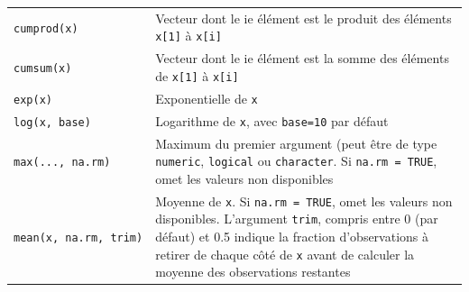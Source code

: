\documentclass[
  11pt,
]{book}
\numberwithin{equation}{section}
\numberwithin{countremarque}{section}
\begin{document}
\begin{longtable}[]{@{}ll@{}}
\begin{minipage}[t]{0.41\columnwidth}
\texttt{cumprod(x)}\strut
\end{minipage} & \begin{minipage}[t]{0.53\columnwidth}\raggedright
Vecteur dont le ie élément est le produit des éléments \texttt{x{[}1{]}} à \texttt{x{[}i{]}}\strut
\end{minipage}\tabularnewline
\begin{minipage}[t]{0.41\columnwidth}\raggedright
\texttt{cumsum(x)}\strut
\end{minipage} & \begin{minipage}[t]{0.53\columnwidth}\raggedright
Vecteur dont le ie élément est la somme des éléments de \texttt{x{[}1{]}} à \texttt{x{[}i{]}}\strut
\end{minipage}\tabularnewline
\begin{minipage}[t]{0.41\columnwidth}\raggedright
\texttt{exp(x)}\strut
\end{minipage} & \begin{minipage}[t]{0.53\columnwidth}\raggedright
Exponentielle de \texttt{x}\strut
\end{minipage}\tabularnewline
\begin{minipage}[t]{0.41\columnwidth}\raggedright
\texttt{log(x,\ base)}\strut
\end{minipage} & \begin{minipage}[t]{0.53\columnwidth}\raggedright
Logarithme de \texttt{x}, avec \texttt{base=10} par défaut\strut
\end{minipage}\tabularnewline
\begin{minipage}[t]{0.41\columnwidth}\raggedright
\texttt{max(...,\ na.rm)}\strut
\end{minipage} & \begin{minipage}[t]{0.53\columnwidth}\raggedright
Maximum du premier argument (peut être de type \texttt{numeric}, \texttt{logical} ou \texttt{character}. Si \texttt{na.rm\ =\ TRUE}, omet les valeurs non disponibles\strut
\end{minipage}\tabularnewline
\begin{minipage}[t]{0.41\columnwidth}\raggedright
\texttt{mean(x,\ na.rm,\ trim)}\strut
\end{minipage} & \begin{minipage}[t]{0.53\columnwidth}\raggedright
Moyenne de \texttt{x}. Si \texttt{na.rm\ =\ TRUE}, omet les valeurs non disponibles. L'argument \texttt{trim}, compris entre 0 (par défaut) et 0.5 indique la fraction d'observations à retirer de chaque côté de \texttt{x} avant de calculer la moyenne des observations restantes\strut

\end{minipage}
\end{longtable}
\end{document}
